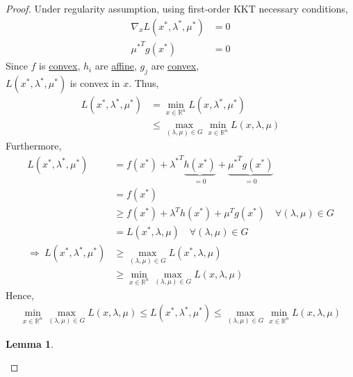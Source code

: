 \documentclass[11pt,a4paper]{article}
\newtheorem{lemma}{Lemma}
\begin{document}
\begin{proof}
    Under regularity assumption, using first-order KKT necessary conditions,
    \begin{equation}
        \begin{aligned}
            \nabla_x L(x^*,\lambda^*,\mu^*)&=0\\
            {\mu^*}^Tg(x^*)&=0
        \end{aligned}
        \nonumber
    \end{equation}
    Since $f$ is \underline{convex}, $h_i$ are \underline{affine}, $g_j$ are \underline{convex},\\
    $L(x^*,\lambda^*,\mu^*)$ is convex in $x$. Thus,
    \begin{equation}
        \begin{aligned}
            L(x^*,\lambda^*,\mu^*)&=\min_{x\in \mathbb{R}^n}L(x,\lambda^*,\mu^*)\\
            &\leq \max_{(\lambda,\mu)\in G}\min_{x\in \mathbb{R}^n}L(x,\lambda,\mu)
        \end{aligned}
        \nonumber
    \end{equation}
    Furthermore,
    \begin{equation}
        \begin{aligned}
            L(x^*,\lambda^*,\mu^*)&=f(x^*)+{\lambda^*}^T \underbrace{h(x^*)}_{=0}+\underbrace{{\mu^*}^T g(x^*)}_{=0}\\
            &=f(x^*)\\
            &\geq f(x^*)+\lambda^Th(x^*)+\mu^Tg(x^*)\quad \forall (\lambda,\mu)\in G\\
            &=L(x^*,\lambda,\mu)\quad \forall (\lambda,\mu)\in G\\
            \Rightarrow	\ L(x^*,\lambda^*,\mu^*)&\geq \max_{(\lambda,\mu)\in G}L(x^*,\lambda,\mu)\\
            &\geq \min_{x\in \mathbb{R}^n}\max_{(\lambda,\mu)\in G}L(x,\lambda,\mu)
        \end{aligned}
        \nonumber
    \end{equation}
    Hence,
    \begin{equation}
        \begin{aligned}
            \min_{x\in \mathbb{R}^n}\max_{(\lambda,\mu)\in G}L(x,\lambda,\mu)\leq L(x^*,\lambda^*,\mu^*)\leq \max_{(\lambda,\mu)\in G}\min_{x\in \mathbb{R}^n}L(x,\lambda,\mu)
        \end{aligned}
        \nonumber
    \end{equation}
    \begin{lemma}

\end{lemma}
\end{proof}
\end{document}
